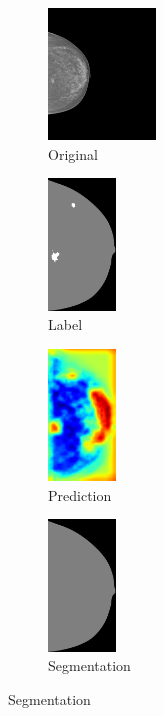\documentclass{beamer}
\begin{document}
\begin{frame}
\begin{figure}[h]
\begin{subfigure}{0.25\textwidth}
				\centering
					\includegraphics[height = 3.5cm]{plots/mammogram_ex2.png}
				\caption{Original}
			\end{subfigure}
			\begin{subfigure}{0.16\textwidth}
				\centering
					\includegraphics[height = 3.5cm]{plots/label_ex2.png}
				\caption{Label}
			\end{subfigure}
			\begin{subfigure}{0.17\textwidth}
				\centering
					\includegraphics[height = 3.5cm]{plots/logits_ex2_v1.png}
				\caption{Prediction}
			\end{subfigure}
			\begin{subfigure}{0.22\textwidth}
				\centering
					\includegraphics[height = 3.5cm]{plots/segmentation_ex2_v1.png}
				\caption{Segmentation}
			\end{subfigure}%
		\end{figure}		
	\end{frame}
	
\end{document}
